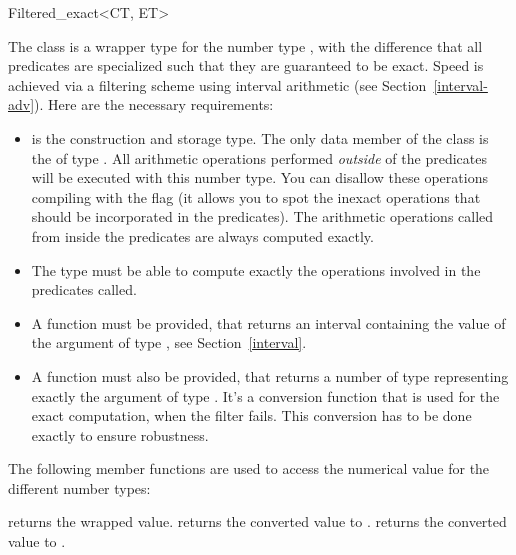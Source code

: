 \begin{ccClassTemplate}{Filtered_exact<CT, ET>} %
\label{filter}


The class  is a wrapper type for the number
type , with the difference
that all predicates are specialized such that they are guaranteed to be exact.
Speed is achieved via a filtering scheme using interval arithmetic (see
Section~\ref{interval-adv}).  Here are the necessary requirements:

\begin{itemize}
\item {} is the construction and storage type.  The only data member of
      the class  is the  of type
      .  All arithmetic operations performed {\em outside} of the
      predicates will be executed with this number type.  You can disallow
      these operations compiling with the flag
       (it allows you
      to spot the inexact operations that should be incorporated in the
      predicates).
      The arithmetic operations called from inside the predicates are always
      computed exactly.
\item The  type must be able to compute exactly the operations involved
      in the predicates called.
\item A  function must
      be provided, that returns an interval containing the value of the
      argument of type , see Section~\ref{interval}.
\item A  function must also be provided, that
      returns a number of type  representing exactly the argument of
      type .  It's a conversion function that is used for the exact
      computation, when the filter fails.
      This conversion has to be done exactly to ensure robustness.
\end{itemize}

The following member functions are used to access the numerical value for the
different number types:

 {returns the wrapped value.}
 {returns the converted value to .}
 {returns the converted value
                                             to .}


\end{ccClassTemplate}
